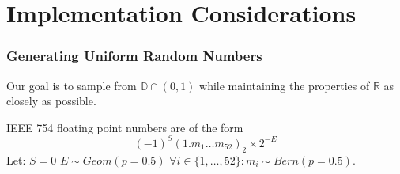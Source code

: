 \documentclass{beamer}
\begin{document}
\section{Implementation Considerations}

\begin{frame}
    \frametitle{Generating Uniform Random Numbers}
    Our goal is to sample from $\mathbb{D} \cap (0,1)$ while maintaining the properties of $\mathbb{R}$ as closely as possible. \newline

    IEEE 754 floating point numbers are of the form
    \[ (-1)^S (1.m_{1} \hdots m_{52})_{2} \times 2^{-E} \]
    Let: \newline
    $S = 0$ \newline
    $E \sim Geom(p=0.5)$ \newline
    $\forall i \in \{1,\hdots,52\}: m_i \sim Bern(p=0.5)$. \newline

\end{frame}
\end{document}
